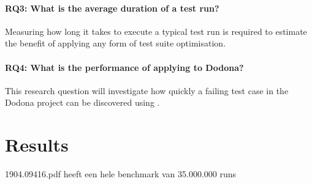 \paragraph*{RQ3: What is the average duration of a test run?}
Measuring how long it takes to execute a typical test run is required to estimate the benefit of applying any form of test suite optimisation.

\paragraph*{RQ4: What is the performance of applying \tcp{} to Dodona?}
This research question will investigate how quickly a failing test case in the Dodona project can be discovered using \velocity{}.



\section{Results}

1904.09416.pdf heeft een hele benchmark van 35.000.000 runs